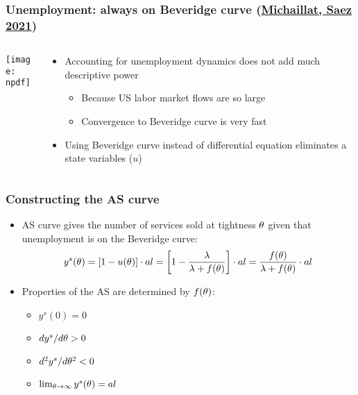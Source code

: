 \documentclass[11pt,aspectratio=169,xcolor={dvipsnames},hyperref={pdftex,pdfpagemode=UseNone,hidelinks,pdfdisplaydoctitle=true},usepdftitle=false]{beamer}
\newcommand{\npdf}{../figures/figures3.pdf}
\begin{document}
\begin{frame}
\frametitle{Unemployment: always on Beveridge curve (\href{https://pascalmichaillat.org/9/}{Michaillat, Saez 2021})}
\begin{columns}
\begin{column}{0.6\textwidth}
\texttt{[image: \\npdf]}%
\end{column}
\begin{column}{0.4\textwidth}
\begin{itemize}
	\item Accounting for unemployment dynamics does not add much descriptive power
	\begin{itemize}
	\item Because US labor market flows are so large 
	\item Convergence to Beveridge curve is very fast
	\end{itemize}
	\item Using Beveridge curve instead of differential equation eliminates a state variables ($u$)
\end{itemize}
\end{column}  
\end{columns}
\end{frame}

\begin{frame}
\frametitle{Constructing the AS curve}
\begin{itemize}	
\item AS curve gives the number of services sold at tightness $\theta$ given that unemployment is on the Beveridge curve:
\begin{equation*}
y^s(\theta) = [1-u(\theta)]\cdot al  = \left[ 1-\frac{\lambda}{\lambda+f(\theta)} \right]\cdot al = \frac{f(\theta)}{\lambda+f(\theta)}\cdot al
\end{equation*}
\item Properties of the AS are determined by $f(\theta)$:
\begin{itemize}
\item $y^s(0) = 0$
\item $d y^s/d \theta>0$
\item $d^2 y^s/d\theta^2 < 0$
\item $\lim_{\theta\to \infty} y^s(\theta) = al$
\end{itemize}
\end{itemize}
\end{frame}
\end{document}
